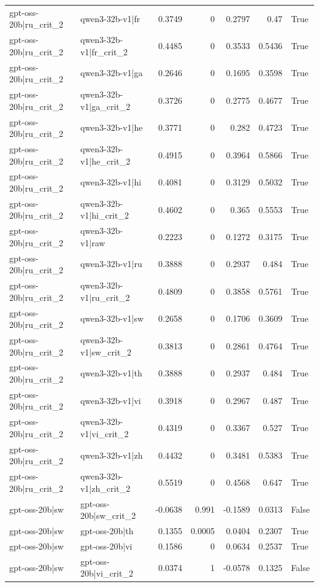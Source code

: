 \begin{table}
\begin{tabular}{l l r r r r l}
gpt-oss-20b|ru_crit_2 & qwen3-32b-v1|fr & 0.3749 & 0 & 0.2797 & 0.47 & True \\
gpt-oss-20b|ru_crit_2 & qwen3-32b-v1|fr_crit_2 & 0.4485 & 0 & 0.3533 & 0.5436 & True \\
gpt-oss-20b|ru_crit_2 & qwen3-32b-v1|ga & 0.2646 & 0 & 0.1695 & 0.3598 & True \\
gpt-oss-20b|ru_crit_2 & qwen3-32b-v1|ga_crit_2 & 0.3726 & 0 & 0.2775 & 0.4677 & True \\
gpt-oss-20b|ru_crit_2 & qwen3-32b-v1|he & 0.3771 & 0 & 0.282 & 0.4723 & True \\
gpt-oss-20b|ru_crit_2 & qwen3-32b-v1|he_crit_2 & 0.4915 & 0 & 0.3964 & 0.5866 & True \\
gpt-oss-20b|ru_crit_2 & qwen3-32b-v1|hi & 0.4081 & 0 & 0.3129 & 0.5032 & True \\
gpt-oss-20b|ru_crit_2 & qwen3-32b-v1|hi_crit_2 & 0.4602 & 0 & 0.365 & 0.5553 & True \\
gpt-oss-20b|ru_crit_2 & qwen3-32b-v1|raw & 0.2223 & 0 & 0.1272 & 0.3175 & True \\
gpt-oss-20b|ru_crit_2 & qwen3-32b-v1|ru & 0.3888 & 0 & 0.2937 & 0.484 & True \\
gpt-oss-20b|ru_crit_2 & qwen3-32b-v1|ru_crit_2 & 0.4809 & 0 & 0.3858 & 0.5761 & True \\
gpt-oss-20b|ru_crit_2 & qwen3-32b-v1|sw & 0.2658 & 0 & 0.1706 & 0.3609 & True \\
gpt-oss-20b|ru_crit_2 & qwen3-32b-v1|sw_crit_2 & 0.3813 & 0 & 0.2861 & 0.4764 & True \\
gpt-oss-20b|ru_crit_2 & qwen3-32b-v1|th & 0.3888 & 0 & 0.2937 & 0.484 & True \\
gpt-oss-20b|ru_crit_2 & qwen3-32b-v1|vi & 0.3918 & 0 & 0.2967 & 0.487 & True \\
gpt-oss-20b|ru_crit_2 & qwen3-32b-v1|vi_crit_2 & 0.4319 & 0 & 0.3367 & 0.527 & True \\
gpt-oss-20b|ru_crit_2 & qwen3-32b-v1|zh & 0.4432 & 0 & 0.3481 & 0.5383 & True \\
gpt-oss-20b|ru_crit_2 & qwen3-32b-v1|zh_crit_2 & 0.5519 & 0 & 0.4568 & 0.647 & True \\
gpt-oss-20b|sw & gpt-oss-20b|sw_crit_2 & -0.0638 & 0.991 & -0.1589 & 0.0313 & False \\
gpt-oss-20b|sw & gpt-oss-20b|th & 0.1355 & 0.0005 & 0.0404 & 0.2307 & True \\
gpt-oss-20b|sw & gpt-oss-20b|vi & 0.1586 & 0 & 0.0634 & 0.2537 & True \\
gpt-oss-20b|sw & gpt-oss-20b|vi_crit_2 & 0.0374 & 1 & -0.0578 & 0.1325 & False \\

\end{tabular}
\end{table}
